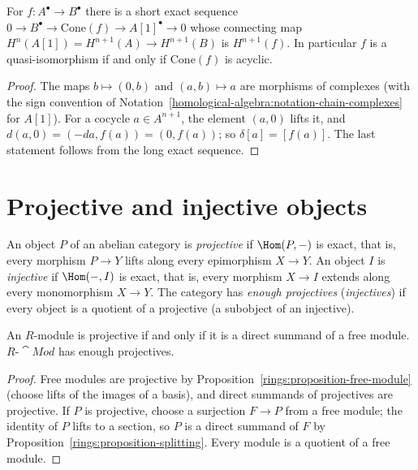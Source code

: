 \begin{proposition}\label{homological-algebra:proposition-cone}
For $f \colon A^\bullet \to B^\bullet$ there is a short exact sequence
$0 \to B^\bullet \to \mathrm{Cone}(f) \to A[1]^\bullet \to 0$ whose connecting map $H^n(A[1]) = H^{n+1}(A) \to H^{n+1}(B)$ is
$H^{n+1}(f)$. In particular $f$ is a quasi-isomorphism if and only if $\mathrm{Cone}(f)$ is acyclic.
\end{proposition}

\begin{proof}
The maps $b \mapsto (0, b)$ and $(a, b) \mapsto a$ are morphisms of complexes (with the sign convention of
Notation~\ref{homological-algebra:notation-chain-complexes} for $A[1]$). For a cocycle $a \in A^{n+1}$, the element
$(a, 0)$ lifts it, and $d(a, 0) = (-da, f(a)) = (0, f(a))$; so $\delta[a] = [f(a)]$. The last statement follows from the long
exact sequence.
\end{proof}

\section{Projective and injective objects}\label{homological-algebra:section-projective-injective}

\begin{definition}\label{homological-algebra:definition-projective-injective}
An object $P$ of an abelian category is \emph{projective} if $\Hom(P, -)$ is exact, that is, every morphism $P \to Y$
lifts along every epimorphism $X \to Y$. An object $I$ is \emph{injective} if $\Hom(-, I)$ is exact, that is, every morphism
$X \to I$ extends along every monomorphism $X \to Y$. The category has \emph{enough projectives} (\emph{injectives}) if
every object is a quotient of a projective (a subobject of an injective).
\end{definition}

\begin{proposition}\label{homological-algebra:proposition-projective-modules}
An $R$-module is projective if and only if it is a direct summand of a free module. $R\text{-}\cat{Mod}$ has enough
projectives.
\end{proposition}

\begin{proof}
Free modules are projective by Proposition~\ref{rings:proposition-free-module} (choose lifts of the images of a basis),
and direct summands of projectives are projective. If $P$ is projective, choose a surjection $F \to P$ from a free module;
the identity of $P$ lifts to a section, so $P$ is a direct summand of $F$ by Proposition~\ref{rings:proposition-splitting}.
Every module is a quotient of a free module.
\end{proof}

